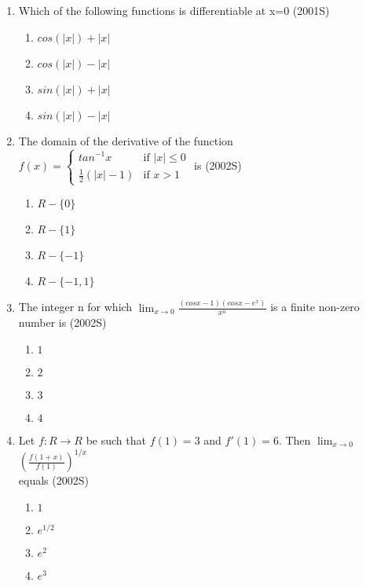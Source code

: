 \documentclass[journal,12pt,twocolumn]{IEEEtran}
\theoremstyle{remark}
\begin{document}
\begin{enumerate}[start=17]
\item %
{\begin{flushleft}
    Which of the following functions is differentiable at x=0 \hfill{(2001S)}
    \begin{enumerate}
     \item $cos(|x|)+|x|$
     \item $cos(|x|)-|x|$
     \item $sin(|x|)+|x|$
     \item $sin(|x|)-|x|$\\
    \end{enumerate}
\end{flushleft}}

\item %
{\begin{flushleft}
    The domain of the derivative of the function $f(x)= \left\{
\begin{array}{ll}
tan^{-1}x
 & \text{if } |x| \leq 0 \\
\frac{1}{2}(|x|-1) & \text{if } x > 1
\end{array}
\right.$ is \hfill{(2002S)}
    \begin{enumerate}
     \item $R-\{0\}$
     \item $R-\{1\}$
     \item $R-\{-1\}$
     \item $R-\{-1,1\}$\\
    \end{enumerate}
\end{flushleft}}

\item %
{\begin{flushleft}
   The integer n for which $\lim_{x \to 0}\frac{(cosx-1)(cosx-e^{x})}{x^{n}}$ is a finite non-zero number is \hfill{(2002S)}
    \begin{enumerate}
     \item $1$
     \item $2$
     \item $3$
     \item $4$\\
    \end{enumerate}
\end{flushleft}}
\newpage
\item %
{\begin{flushleft}
Let $f:R \rightarrow R$ be such that $f(1)=3$ and $f'(1)=6$. Then $\lim_{x \to 0}$ $ \left (\frac{f(1+x)}{f(1)}\right)^{1/x}$\ \\ equals \hfill{(2002S)}
    \begin{enumerate}
     \item $1$
     \item $e^{1/2}$
     \item $e^2$
     \item $e^3$\\
    \end{enumerate}
\end{flushleft}}


\end{enumerate}
\end{document}
